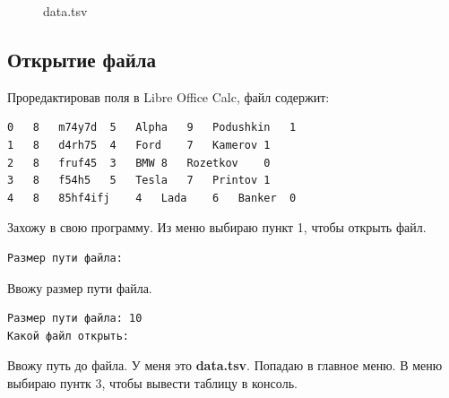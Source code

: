 \begin{figure}[h]
    \caption{data.tsv}
    \label{fig:data-tsv-on-github}
\end{figure}

\subsection{Открытие файла}

Проредактировав поля в Libre Office Calc, файл содержит:

\begin{tcolorbox}
\begin{verbatim}
0	8	m74y7d	5	Alpha	9	Podushkin	1
1	8	d4rh75	4	Ford	7	Kamerov	1
2	8	fruf45	3	BMW	8	Rozetkov	0
3	8	f54h5	5	Tesla	7	Printov	1
4	8	85hf4ifj	4	Lada	6	Banker	0
\end{verbatim}
\end{tcolorbox}

Захожу в свою программу. Из меню выбираю пункт 1, чтобы открыть файл.

\begin{tcolorbox}
\begin{verbatim}
Размер пути файла: 
\end{verbatim}
\end{tcolorbox}

Ввожу размер пути файла.

\begin{tcolorbox}
\begin{verbatim}
Размер пути файла: 10
Какой файл открыть:     
\end{verbatim}
\end{tcolorbox}

Ввожу путь до файла. У меня это \textbf{data.tsv}. Попадаю в главное меню. В меню выбираю пунтк 3, чтобы вывести таблицу в консоль.

